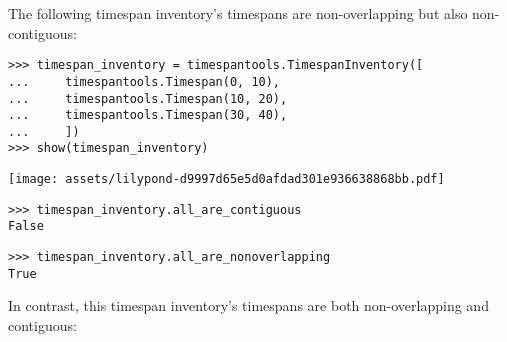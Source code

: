 \noindent The following timespan inventory's timespans are non-overlapping but
also non-contiguous:

\begin{comment}
<abjad>
timespan_inventory = timespantools.TimespanInventory([
    timespantools.Timespan(0, 10),
    timespantools.Timespan(10, 20),
    timespantools.Timespan(30, 40),
    ])
show(timespan_inventory)
timespan_inventory.all_are_contiguous
timespan_inventory.all_are_nonoverlapping
</abjad>
\end{comment}

\begin{abjadbookoutput}
\begin{singlespacing}
\vspace{-0.5\baselineskip}
\begin{lstlisting}
>>> timespan_inventory = timespantools.TimespanInventory([
...     timespantools.Timespan(0, 10),
...     timespantools.Timespan(10, 20),
...     timespantools.Timespan(30, 40),
...     ])
>>> show(timespan_inventory)
\end{lstlisting}
\noindent\texttt{[image: assets/lilypond-d9997d65e5d0afdad301e936638868bb.pdf]}
\begin{lstlisting}
>>> timespan_inventory.all_are_contiguous
False
\end{lstlisting}
\begin{lstlisting}
>>> timespan_inventory.all_are_nonoverlapping
True
\end{lstlisting}
\end{singlespacing}
\end{abjadbookoutput}

\noindent In contrast, this timespan inventory's timespans are both
non-overlapping and contiguous:

\begin{comment}
<abjad>
timespan_inventory = timespantools.TimespanInventory([
    timespantools.Timespan(0, 10),
    timespantools.Timespan(10, 20),
    timespantools.Timespan(20, 30),
    ])
show(timespan_inventory)
timespan_inventory.all_are_contiguous
timespan_inventory.all_are_nonoverlapping
</abjad>
\end{comment}

